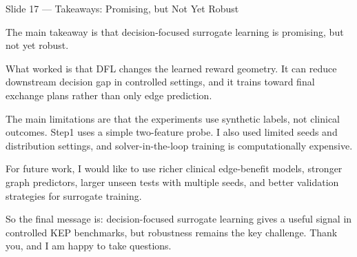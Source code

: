 \documentclass[11pt, aspectratio=169]{beamer}
\newcommand{\timing}[1]{}
\begin{document}
\begin{frame}{Slide 17 \enspace\textmd{\small\textcolor{black!40}{--- Takeaways: Promising, but Not Yet Robust}}}
\small
\timing{45 seconds}

The main takeaway is that decision-focused surrogate learning is promising, but
not yet robust.

\vspace{0.35em}
What worked is that DFL changes the learned reward geometry. It can reduce
downstream decision gap in controlled settings, and it trains toward final
exchange plans rather than only edge prediction.

\vspace{0.35em}
The main limitations are that the experiments use synthetic labels, not clinical
outcomes. Step1 uses a simple two-feature probe. I also used limited seeds and
distribution settings, and solver-in-the-loop training is computationally
expensive.

\vspace{0.35em}
For future work, I would like to use richer clinical edge-benefit models,
stronger graph predictors, larger unseen tests with multiple seeds, and better
validation strategies for surrogate training.

\vspace{0.35em}
So the final message is: decision-focused surrogate learning gives a useful
signal in controlled KEP benchmarks, but robustness remains the key challenge.
Thank you, and I am happy to take questions.

\end{frame}
\end{document}
